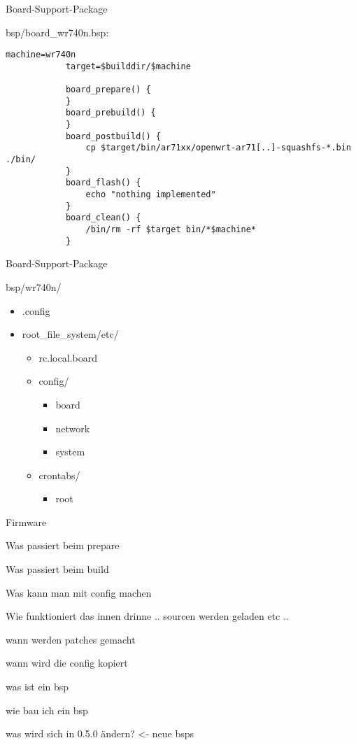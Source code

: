 \begin{frame}[fragile]{Board-Support-Package}
    \begin{block}{bsp/board\_wr740n.bsp:}
        \scriptsize
        \begin{lstlisting}[gobble=12]
            machine=wr740n
            target=$builddir/$machine

            board_prepare() {
            }
            board_prebuild() {
            }
            board_postbuild() {
                cp $target/bin/ar71xx/openwrt-ar71[..]-squashfs-*.bin ./bin/
            }
            board_flash() {
                echo "nothing implemented"
            }
            board_clean() {
                /bin/rm -rf $target bin/*$machine*
            }
        \end{lstlisting}
    \end{block}
\end{frame}

\begin{frame}{Board-Support-Package}
    \begin{block}{bsp/wr740n/}
        \begin{itemize}
            \item .config
            \item root\_file\_system/etc/
            \begin{itemize}
                \item rc.local.board
                \item config/
                \begin{itemize}
                    \item board
                    \item network
                    \item system
                \end{itemize}
                \item crontabs/
                \begin{itemize}
                    \item root
                \end{itemize}
            \end{itemize}
        \end{itemize}
    \end{block}
\end{frame}

\begin{frame}{Firmware}

    Was passiert beim prepare

    Was passiert beim build

    Was kann man mit config machen

\end{frame}

Wie funktioniert das innen drinne .. sourcen werden geladen etc ..

wann werden patches gemacht

wann wird die config kopiert

was ist ein bsp

wie bau ich ein bsp

was wird sich in 0.5.0 ändern? <- neue bsps
